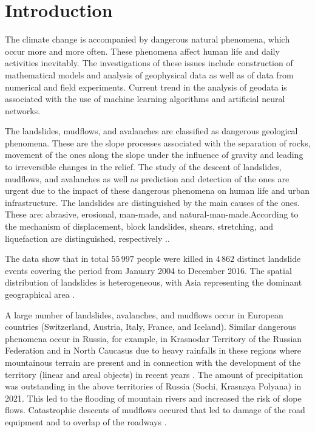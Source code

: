 \documentclass[sensors,article,submit,moreauthors,pdftex]{Definitions/mdpi}
\begin{document}
\section{Introduction}

The climate change is accompanied by dangerous natural phenomena, which occur more and more often. These phenomena affect human life and daily activities inevitably. The investigations of these issues include construction of mathematical models and analysis of geophysical data as well as of data from numerical and field experiments. Current trend in the analysis of geodata is associated with the use of machine learning algorithms and artificial neural networks.

The landslides, mudflows, and avalanches are classified as dangerous geological phenomena. These are the slope processes associated with the separation of rocks, movement of the ones along the slope under the influence of gravity and leading to irreversible changes in the relief. The study of the descent of landslides, mudflows, and avalanches as well as prediction and detection of the ones are urgent due to the impact of these dangerous phenomena on human life and urban infrastructure. The landslides are distinguished by the main causes of the ones. These are: abrasive, erosional, man-made, and natural-man-made.According to the mechanism of displacement, block landslides, shears, stretching, and liquefaction are distinguished, respectively \cite{Pendin2015}..

The data show that in total $55\,997$ people were killed in $4\,862$ distinct landslide events covering the period from January 2004 to December 2016. The spatial distribution of landslides is heterogeneous, with Asia representing the dominant geographical area \cite{Froude2018}.

A large number of landslides, avalanches, and mudflows occur in European countries (Switzerland, Austria, Italy, France, and Iceland). Similar dangerous phenomena occur in Russia, for example, in Krasnodar Territory of the Russian Federation and in  North Caucasus due to heavy rainfalls in these regions where mountainous terrain are present and in connection with the development of the territory (linear and areal objects) in recent years \cite{hungr2005landslide}.  The amount of precipitation was outstanding in the above territories of Russia (Sochi, Krasnaya Polyana) in 2021. This led to the flooding of mountain rivers and increased the risk of slope flows. Catastrophic descents of mudflows occured that led to damage of the road equipment and to overlap of the roadways \cite{Harch2020}.
\end{document}
